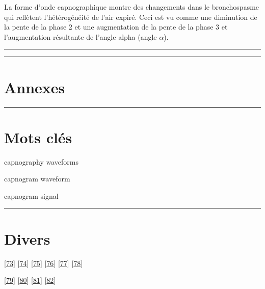 \documentclass[12pt,]{article}
\begin{document}
La forme d'onde capnographique montre des changements dans le
bronchospasme qui reflètent l'hétérogénéité de l'air expiré. Ceci est vu
comme une diminution de la pente de la phase 2 et une augmentation de la
pente de la phase 3 et l'augmentation résultante de l'angle alpha (angle
\(\alpha\)).

\pagebreak

\begin{center}\rule{0.5\linewidth}{0.5pt}\end{center}

\pagebreak

\begin{center}\rule{0.5\linewidth}{0.5pt}\end{center}

\hypertarget{annexes}{%
\section{Annexes}\label{annexes}}

\pagebreak

\begin{center}\rule{0.5\linewidth}{0.5pt}\end{center}

\hypertarget{mots-cluxe9s}{%
\section{Mots clés}\label{mots-cluxe9s}}

capnography waveforms

capnogram waveform

capnogram signal

\pagebreak

\begin{center}\rule{0.5\linewidth}{0.5pt}\end{center}

\hypertarget{divers-1}{%
\section{Divers}\label{divers-1}}

{[}\protect\hyperlink{ref-delmas2011readmissions}{73}{]}
{[}\protect\hyperlink{ref-delmas2010asthma}{74}{]}
{[}\protect\hyperlink{ref-delmas2017augmentation}{75}{]}
{[}\protect\hyperlink{ref-tattersfield2001asthma}{76}{]}
{[}\protect\hyperlink{ref-hart2002asthma}{77}{]}
{[}\protect\hyperlink{ref-salmeron2001asthma}{78}{]}

{[}\protect\hyperlink{ref-anto2001epidemiology}{79}{]}
{[}\protect\hyperlink{ref-charvanne2008bronchopneumopathie}{80}{]}
{[}\protect\hyperlink{ref-roche2007donnees}{81}{]}
{[}\protect\hyperlink{ref-fuhrman2007mortalite}{82}{]}
\end{document}
